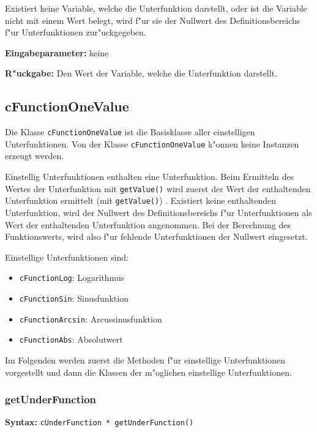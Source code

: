 Existiert keine Variable, welche die Unterfunktion darstellt, oder ist die Variable nicht mit einem Wert belegt, wird f"ur sie der Nullwert des Definitionsbereichs f"ur Unterfunktionen zur"uckgegeben.

\bigskip\noindent
\textbf{Eingabeparameter:} keine

\bigskip\noindent
\textbf{R"uckgabe:} Den Wert der Variable, welche die Unterfunktion darstellt.



\subsection{cFunctionOneValue}

Die Klasse \verb|cFunctionOneValue| ist die Basisklasse aller einstelligen Unterfunktionen. Von der Klasse \verb|cFunctionOneValue| k"onnen keine Instanzen erzeugt werden.

Einstellig Unterfunktionen enthalten eine Unterfunktion. Beim Ermitteln des Wertes der Unterfunktion mit \verb|getValue()| wird zuerst der Wert der enthaltenden Unterfunktion ermittelt (mit \verb|getValue()|) . Existiert keine enthaltenden Unterfunktion, wird der Nullwert des Definitionsbereichs f"ur Unterfunktionen als Wert der enthaltenden Unterfunktion angenommen. Bei der Berechnung des Funktionswerts, wird also f"ur fehlende Unterfunktionen der Nullwert eingesetzt.

\bigskip\noindent
Einstellige Unterfunktionen sind:
\begin{itemize}
 \item \verb|cFunctionLog|: Logarithmus
 \item \verb|cFunctionSin|: Sinusfunktion
 \item \verb|cFunctionArcsin|: Arcussinusfunktion
 \item \verb|cFunctionAbs|: Absolutwert
\end{itemize}

Im Folgenden werden zuerst die Methoden f"ur einstellige Unterfunktionen vorgestellt und dann die Klassen der m"oglichen einstellige Unterfunktionen.


\subsubsection{getUnderFunction}

\textbf{Syntax:} \verb|cUnderFunction * getUnderFunction()|

